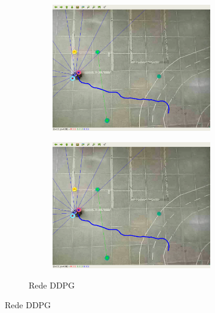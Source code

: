 \begin{figure}[H]
\begin{center}
\begin{subfigure}[b]{0.60\textwidth}
\begin{subfigure}[b]{0.24\textwidth}
            \includegraphics[width=\textwidth]{imagens/real_envs/real_env1_ddpg/7.png}
        \end{subfigure}
        \hfill
        \begin{subfigure}[b]{0.24\textwidth}
            \includegraphics[width=\textwidth]{imagens/real_envs/real_env1_ddpg/7.png}
        \end{subfigure}
        \caption{Rede DDPG}
        \label{subfig:real_env1_ddpg}
    \end{subfigure}
      

\end{center}
\end{figure}
